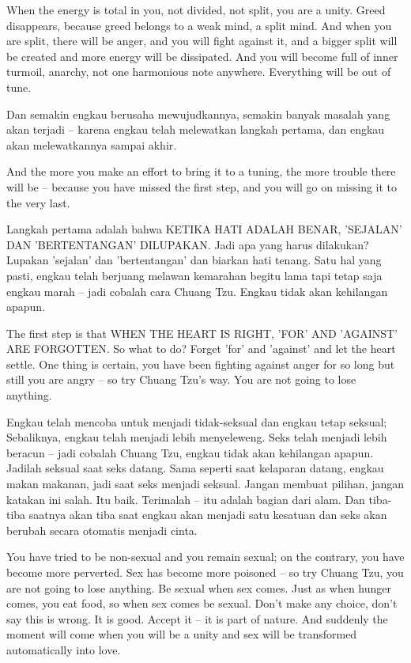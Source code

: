 \english
When the energy is total in you, not divided, not split, you are a unity. Greed disappears, because greed belongs to a weak mind, a split mind. And when you are split, there will be anger, and you will fight against it, and a bigger split will be created and more energy will be dissipated. And you will become full of inner turmoil, anarchy, not one harmonious note anywhere. Everything will be out of tune.

\bahasa
Dan semakin engkau berusaha mewujudkannya, semakin banyak masalah yang akan terjadi -- karena engkau telah melewatkan langkah pertama, dan engkau akan melewatkannya sampai akhir.

\english
And the more you make an effort to bring it to a tuning, the more trouble there will be -- because you have missed the first step, and you will go on missing it to the very last.

\bahasa
Langkah pertama adalah bahwa KETIKA HATI ADALAH BENAR, 'SEJALAN' DAN 'BERTENTANGAN' DILUPAKAN. Jadi apa yang harus dilakukan? Lupakan 'sejalan' dan 'bertentangan' dan biarkan hati tenang. Satu hal yang pasti, engkau telah berjuang melawan kemarahan begitu lama tapi tetap saja engkau marah -- jadi cobalah cara Chuang Tzu. Engkau tidak akan kehilangan apapun.

\english
The first step is that WHEN THE HEART IS RIGHT, 'FOR' AND 'AGAINST' ARE FORGOTTEN. So what to do? Forget 'for' and 'against' and let the heart settle. One thing is certain, you have been fighting against anger for so long but still you are angry -- so try Chuang Tzu's way. You are not going to lose anything.

\bahasa
Engkau telah mencoba untuk menjadi tidak-seksual dan engkau tetap seksual; Sebaliknya, engkau telah menjadi lebih menyeleweng. Seks telah menjadi lebih beracun -- jadi cobalah Chuang Tzu, engkau tidak akan kehilangan apapun. Jadilah seksual saat seks datang. Sama seperti saat kelaparan datang, engkau makan makanan, jadi saat seks menjadi seksual. Jangan membuat pilihan, jangan katakan ini salah. Itu baik. Terimalah -- itu adalah bagian dari alam. Dan tiba-tiba saatnya akan tiba saat engkau akan menjadi satu kesatuan dan seks akan berubah secara otomatis menjadi cinta.

\english
You have tried to be non-sexual and you remain sexual; on the contrary, you have become more perverted. Sex has become more poisoned -- so try Chuang Tzu, you are not going to lose anything. Be sexual when sex comes. Just as when hunger comes, you eat food, so when sex comes be sexual. Don't make any choice, don't say this is wrong. It is good. Accept it -- it is part of nature. And suddenly the moment will come when you will be a unity and sex will be transformed automatically into love.


